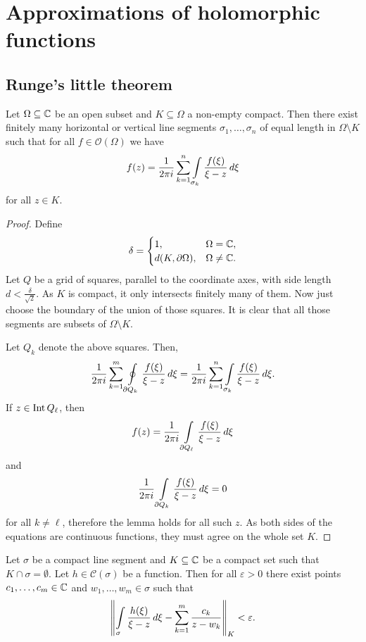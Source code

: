 \section{Approximations of holomorphic functions}

\subsection{Runge's little theorem}


\begin{lema}\label{app:lm:seg}
Let $\Omega \subseteq \mathbb{C}$ be an open subset and
$K \subseteq \Omega$ a non-empty compact. Then there exist finitely
many horizontal or vertical line segments
$\sigma_1, \dots, \sigma_n$ of equal length in
$\Omega \setminus K$ such that for all $f \in \mathcal{O}(\Omega)$
we have
\[
f(z) = \frac{1}{2 \pi i} \sum_{k=1}^n
\int\limits_{\sigma_k} \frac{f(\xi)}{\xi - z}\,d\xi
\]
for all $z \in K$.
\end{lema}

\begin{proof}
Define
\[
\delta =
\begin{cases}
          1,           & \Omega = \mathbb{C},   \\
d(K, \partial \Omega), & \Omega \ne \mathbb{C}.
\end{cases}
\]
Let $Q$ be a grid of squares, parallel to the coordinate axes, with
side length $d < \frac{\delta}{\sqrt{2}}$. As $K$ is compact, it
only intersects finitely many of them. Now just choose the boundary
of the union of those squares. It is clear that all those segments
are subsets of $\Omega \setminus K$.

Let $Q_k$ denote the above squares. Then,
\[
\frac{1}{2 \pi i} \sum_{k=1}^m \oint\limits_{\partial Q_k}
\frac{f(\xi)}{\xi - z}\,d\xi =
\frac{1}{2 \pi i} \sum_{k=1}^n \int\limits_{\sigma_k}
\frac{f(\xi)}{\xi - z}\,d\xi.
\]
If $z \in \operatorname{Int} Q_\ell$, then
\[
f(z) =
\frac{1}{2 \pi i} \int\limits_{\partial Q_\ell}
\frac{f(\xi)}{\xi - z}\,d\xi
\]
and
\[
\frac{1}{2 \pi i} \int\limits_{\partial Q_k}
\frac{f(\xi)}{\xi - z}\,d\xi = 0
\]
for all $k \ne \ell$, therefore the lemma holds for all such $z$.
As both sides of the equations are continuous functions, they must
agree on the whole set $K$.
\end{proof}

\begin{lema}\label{app:lm:app_seg}
Let $\sigma$ be a compact line segment and $K \subseteq \mathbb{C}$ be a
compact set such that $K \cap \sigma = \emptyset$. Let
$h \in \mathcal{C}(\sigma)$ be a function. Then for all
$\varepsilon > 0$ there exist points $c_1, \dots, c_m \in \mathbb{C}$ and
$w_1, \dots, w_m \in \sigma$ such that
\[
\left\lVert \int\limits_\sigma \frac{h(\xi)}{\xi - z}\,d\xi -
\sum_{k=1}^m \frac{c_k}{z - w_k}\right\rVert_K <
\varepsilon.
\]
\end{lema}

